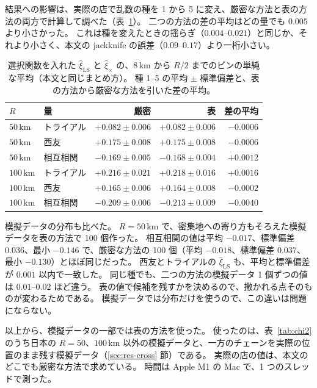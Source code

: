 \documentclass[a4paper,11pt]{ltjsarticle}
\begin{document}
結果への影響は、実際の店で乱数の種を 1 から 5 に変え、厳密な方法と表の方法の両方で計算して調べた（表~\ref{tab:grid-result}）。
二つの方法の差の平均はどの量でも $0.005$ より小さかった。
これは種を変えたときの揺らぎ（$0.004$--$0.021$）と同じか、それより小さく、本文の jackknife の誤差（$0.09$--$0.17$）より一桁小さい。
\begin{table}[t]
  \centering
  \caption{選択関数を入れた $\hat\xi_{\mathrm{LS}}$ と $\hat\xi_{\times}$ の、$8\,\mathrm{km}$ から $R/2$ までのビンの単純な平均（本文と同じまとめ方）。
    種 1--5 の平均 $\pm$ 標準偏差と、表の方法から厳密な方法を引いた差の平均。}
  \label{tab:grid-result}
  \small
  \begin{tabular}{llrrr}
    \toprule
    $R$ & 量 & 厳密 & 表 & 差の平均 \\
    \midrule
    $50\,\mathrm{km}$ & トライアル & $+0.082 \pm 0.006$ & $+0.082 \pm 0.006$ & $-0.0006$ \\
    $50\,\mathrm{km}$ & 西友 & $+0.175 \pm 0.008$ & $+0.175 \pm 0.008$ & $-0.0006$ \\
    $50\,\mathrm{km}$ & 相互相関 & $-0.169 \pm 0.005$ & $-0.168 \pm 0.004$ & $+0.0012$ \\
    $100\,\mathrm{km}$ & トライアル & $+0.216 \pm 0.021$ & $+0.218 \pm 0.016$ & $+0.0016$ \\
    $100\,\mathrm{km}$ & 西友 & $+0.165 \pm 0.006$ & $+0.164 \pm 0.008$ & $-0.0002$ \\
    $100\,\mathrm{km}$ & 相互相関 & $-0.209 \pm 0.006$ & $-0.213 \pm 0.009$ & $-0.0040$ \\
    \bottomrule
  \end{tabular}
\end{table}

模擬データの分布も比べた。
$R = 50\,\mathrm{km}$ で、密集地への寄り方もそろえた模擬データを表の方法で 100 個作った。
相互相関の値は平均 $-0.017$、標準偏差 $0.036$、最小 $-0.146$ で、厳密な方法の 100 個（平均 $-0.018$、標準偏差 $0.037$、最小 $-0.130$）とほぼ同じだった。
西友とトライアルの $\hat\xi_{\mathrm{LS}}$ も、平均と標準偏差が $0.001$ 以内で一致した。
同じ種でも、二つの方法の模擬データ 1 個ずつの値は $0.01$--$0.02$ ほど違う。
表の値で候補を残すかを決めるので、撒かれる点そのものが変わるためである。
模擬データでは分布だけを使うので、この違いは問題にならない。

以上から、模擬データの一部では表の方法を使った。
使ったのは、表~\ref{tab:chi2} のうち日本の $R = 50$、$100\,\mathrm{km}$ 以外の模擬データと、一方のチェーンを実際の位置のまま残す模擬データ（\ref{sec:res-cross} 節）である。
実際の店の値は、本文のどこでも厳密な方法で求めている。
時間は Apple M1 の Mac で、1 つのスレッドで測った。
\end{document}
